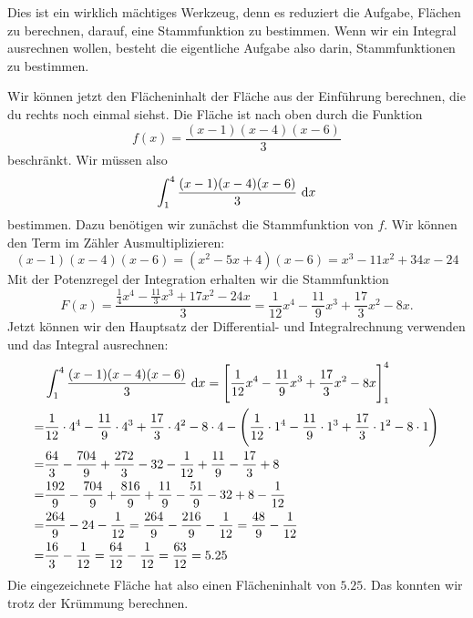 \documentclass[../../main.tex]{subfiles}
\begin{document}
Dies ist ein wirklich mächtiges Werkzeug, denn es reduziert die Aufgabe, Flächen zu berechnen, darauf, eine Stammfunktion
zu bestimmen. Wenn wir ein Integral ausrechnen wollen, besteht die eigentliche Aufgabe also darin, Stammfunktionen zu
bestimmen.
\begin{example}{}
    Wir können jetzt den Flächeninhalt der Fläche aus der Einführung berechnen, die du rechts noch einmal siehst. Die
    Fläche ist nach oben durch die Funktion
    \[f(x)=\frac{(x-1)(x-4)(x-6)}{3}\]
    beschränkt. Wir müssen also
    \[\int_1^4\frac{(x-1)(x-4)(x-6)}{3}\mathop{}\mathrm{d} x\]
    bestimmen. Dazu benötigen wir zunächst die Stammfunktion von $f$. Wir können den Term im Zähler Ausmultiplizieren:
    \[(x-1)(x-4)(x-6)=(x^2-5x+4)(x-6)=x^3-11x^2+34x-24\]
    Mit der Potenzregel der Integration erhalten wir die Stammfunktion
    \[F(x)=\frac{\frac{1}{4}x^4-\frac{11}{3}x^3+17x^2-24x}{3}=\frac{1}{12}x^4-\frac{11}{9}x^3+\frac{17}{3}x^2-8x.\]
    Jetzt können wir den Hauptsatz der Differential- und Integralrechnung verwenden und das Integral ausrechnen:
    \begin{align*}
        &\int_1^4\frac{(x-1)(x-4)(x-6)}{3}\mathop{}\mathrm{d} x=\Biggl[\frac{1}{12}x^4-\frac{11}{9}x^3+\frac{17}{3}x^2-8x\Biggr]_1^4\\
        =&\frac{1}{12}\cdot 4^4-\frac{11}{9}\cdot 4^3+\frac{17}{3}\cdot 4^2-8\cdot 4-\Biggl(\frac{1}{12}\cdot 1^4-\frac{11}{9}\cdot 1^3+\frac{17}{3}\cdot 1^2-8\cdot 1\Biggr)\\
        =&\frac{64}{3}-\frac{704}{9}+\frac{272}{3}-32-\frac{1}{12}+\frac{11}{9}-\frac{17}{3}+8\\
        =&\frac{192}{9}-\frac{704}{9}+\frac{816}{9}+\frac{11}{9}-\frac{51}{9}-32+8-\frac{1}{12}\\
        =&\frac{264}{9}-24-\frac{1}{12}
        =\frac{264}{9}-\frac{216}{9}-\frac{1}{12}
        =\frac{48}{9}-\frac{1}{12}\\
        =&\frac{16}{3}-\frac{1}{12}
        =\frac{64}{12}-\frac{1}{12}
        =\frac{63}{12}=5.25\\
    \end{align*}
    Die eingezeichnete Fläche hat also einen Flächeninhalt von $5.25$. Das konnten wir trotz der Krümmung berechnen.
\end{example}
\end{document}
